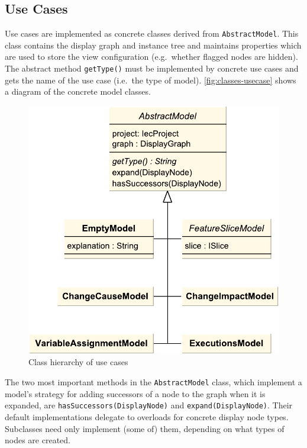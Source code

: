 \subsection{Use Cases}

Use cases are implemented as concrete classes derived from \lstinline|AbstractModel|. This class contains the display 
graph and instance tree and maintains properties which are used to store the view configuration (e.g.\ whether flagged 
nodes are hidden). The abstract method \lstinline|getType()| must be implemented by concrete use cases and gets the 
name of the use case (i.e.\ the type of model). \autoref{fig:classes-usecase} shows a diagram of the concrete model 
classes.

\begin{figure}[htb]
  \centering
    \includegraphics[scale=0.6]{bilder/classes-usecase}
  \caption{Class hierarchy of use cases}
  \label{fig:classes-usecase}
\end{figure}

The two most important methods in the \lstinline|AbstractModel| class, which implement a model's strategy for adding 
successors of a node to the graph when it is expanded, are \lstinline|hasSuccessors(DisplayNode)| and 
\lstinline|expand(DisplayNode)|. Their default implementations delegate to overloads for concrete display node types. 
Subclasses need only implement (some of) them, depending on what types of nodes are created.

